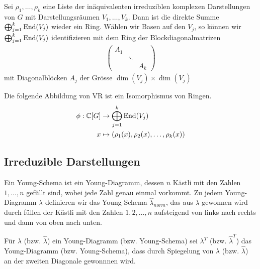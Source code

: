 \begin{satz}
    Sei $\rho_1,\dots,\rho_k$ eine Liste der inäquivalenten irreduziblen
    komplexen Darstellungen von $G$ mit Darstellungsräumen $V_1,\dots,V_k$.
    Dann ist die direkte Summe $\bigoplus_{j=1}^k \text{End}(V_j)$ wieder ein
    Ring. Wählen wir Basen auf den $V_j$, so können wir $\bigoplus_{j=1}^k \text{End}(V_j)$
    identifizieren mit dem Ring der Blockdiagonalmatrizen
    \begin{align*}
        \begin{pmatrix}
            A_1 & & \\
            & \ddots & \\
            & & A_k
        \end{pmatrix}
    \end{align*}
    mit Diagonalblöcken $A_j$ der Grösse $\dim(V_j) \times \dim(V_j)$
\end{satz}

\begin{satz}
    Die folgende Abbildung von VR ist ein Isomorphismus von Ringen.
    \begin{align*}
        \phi: \mathbb{C}[G] &\rightarrow \bigoplus_{j=1}^{k} \text{End}(V_j)
        \\
        x &\mapsto \left( \rho_1(x),\rho_2(x),\dots,\rho_k(x) \right)
    \end{align*}
\end{satz}

\subsection{Irreduzible Darstellungen}

\begin{definition}
    Ein Young-Schema ist ein Young-Diagramm, dessen $n$ Kästli mit den Zahlen
    $1,\dots,n$ gefüllt sind, wobei jede Zahl genau einmal vorkommt. Zu jedem
    Young-Diagramm $\lambda$ definieren wir das Young-Schema $\hat{\lambda}_{norm}$,
    das aus $\lambda$ gewonnen wird durch füllen der Kästli mit den Zahlen
    $1,2,\dots,n$ aufsteigend von links nach rechts und dann von oben nach unten.
\end{definition}

\begin{definition}
    Für $\lambda$ (bzw. $\hat{\lambda}$) ein Young-Diagramm (bzw. Young-Schema)
    sei $\lambda^T$ (bzw. $\hat{\lambda}^T$) das Young-Diagramm (bzw. Young-Schema),
    dass durch Spiegelung von $\lambda$ (bzw. $\hat{\lambda}$) an der zweiten
    Diagonale gewonnnen wird.
\end{definition}

